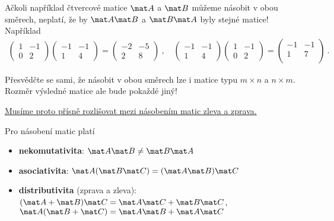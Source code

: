 \begin{example}
    Ačkoli například čtvercové matice $\mat A$ a $\mat B$ můžeme násobit v obou směrech, neplatí, že by $\mat A \mat B$ a $\mat B \mat A$ byly stejné matice!
    Například \begin{align}
        \begin{pmatrix}
            1 & -1 \\
            0 & 2
        \end{pmatrix}
        \begin{pmatrix}
            -1 & -1 \\
            1 & 4
        \end{pmatrix}
        =
        \begin{pmatrix}
            -2 & -5 \\
            2 & 8
        \end{pmatrix} \:, \quad
        \begin{pmatrix}
            -1 & -1 \\
            1 & 4
        \end{pmatrix}
        \begin{pmatrix}
            1 & -1 \\
            0 & 2
        \end{pmatrix}
        =
        \begin{pmatrix}
            -1 & -1\\
            1 & 7\\
        \end{pmatrix} \:.
    \end{align}

    Přesvědčte se sami, že násobit v obou směrech lze i matice typu $m \times n$ a $n \times m$. Rozměr výsledné matice ale bude pokaždé jiný!

    \underline{Musíme proto přísně rozlišovat mezi násobením matic zleva a zprava.}
\end{example}

Pro násobení matic platí
\begin{itemize}
    \item \textbf{nekomutativita}: $\mat A \mat B \neq \mat B \mat A$
    \item \textbf{asociativita}: $\mat A (\mat B \mat C) = (\mat A \mat B) \mat C$
    \item \textbf{distributivita} (zprava a zleva): $(\mat A + \mat B) \mat C = \mat A \mat C + \mat B \mat C$, $\mat A(\mat B + \mat C) = \mat A \mat B + \mat A \mat C$
\end{itemize}

